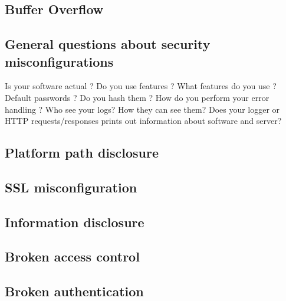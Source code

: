 \documentclass{article}[12pt]
\begin{document}
\subsection{Buffer Overflow}


\subsection{General questions about security misconfigurations}
Is your software actual ? \newline
Do you use features ? What features do you use ? \newline
Default passwords ? Do you hash them ? \newline
How do you perform your error handling ? \newline
Who see your logs? How they can see them? \newline
Does your logger or HTTP requests/responses prints out information about software and server?

\subsection{Platform path disclosure}
\subsection{SSL misconfiguration}
\subsection{Information disclosure}
\subsection{Broken access control}
\subsection{Broken authentication}


\end{document}

